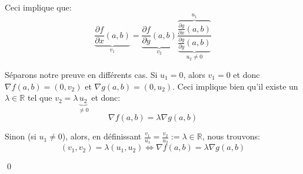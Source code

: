 \documentclass[a4paper]{article}
\begin{document}
{{        Ceci implique que:
        \[\underbrace{\frac{\partial f}{\partial x}\left(a, b\right)}_{v_1} = \underbrace{\frac{\partial f}{\partial y}\left(a, b\right)}_{v_2} \frac{\overbrace{\frac{\partial g}{\partial x}\left(a, b\right)}^{u_1}}{\underbrace{\frac{\partial g}{\partial y}\left(a, b\right)}_{u_2 \neq0}}\]

        Séparons notre preuve en différents cas. Si $u_1 = 0$, alors $v_1 = 0$ et donc $\nabla f\left(a, b\right) = \left(0, v_2\right)$ et $\nabla g\left(a, b\right) = \left(0, u_2\right)$. Ceci implique bien qu'il existe un $\lambda \in \mathbb{R}$ tel que $v_2 = \lambda \underbrace{u_2}_{\neq 0}$ et donc:
        \[\nabla f\left(a, b\right) = \lambda \nabla g\left(a, b\right)\]

        Sinon (si $u_1 \neq 0$), alors, en définissant $\frac{v_1}{u_1} = \frac{v_2}{u_2} := \lambda \in \mathbb{R}$, nous trouvons:
        \[\left(v_1, v_2\right) = \lambda\left(u_1, u_2\right) \iff \nabla f\left(a, b\right) = \lambda \nabla g\left(a, b\right)\]

        \qed
    }

}
\end{document}
